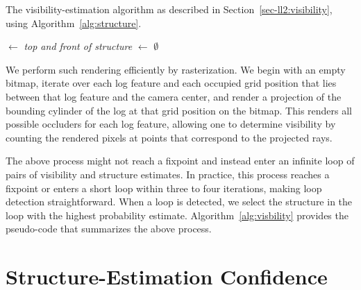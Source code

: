 \begin{algorithm}[t]
  \caption{The visibility-estimation algorithm as described in
    Section~\ref{sec-ll2:visibility}, using Algorithm~\ref{alg:structure}.}
  \Visible$\leftarrow$ \emph{top and front of structure}\;
  \CurrentStructure$\leftarrow$ $\emptyset$\;
  \label{alg:visbility}
\end{algorithm}

We perform such rendering efficiently by rasterization.
%
We begin with an empty bitmap, iterate over each log feature and each occupied
grid position that lies between that log feature and the camera center, and
render a projection of the bounding cylinder of the log at that grid position
on the bitmap.
%
This renders all possible occluders for each log feature, allowing one to
determine visibility by counting the rendered pixels at points that correspond
to the projected rays.

The above process might not reach a fixpoint and instead enter an infinite loop
of pairs of visibility and structure estimates.
%
In practice, this process reaches a fixpoint or enters a short loop within
three to four iterations, making loop detection straightforward.
%
When a loop is detected, we select the structure in the loop with the highest
probability estimate.
%
Algorithm~\ref{alg:visbility} provides the pseudo-code that summarizes the
above process.

\par\vspace{-1ex}
\section{Structure-Estimation Confidence}
\label{sec-ll2:confidence}

